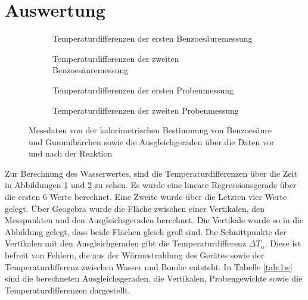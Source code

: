 \section{Auswertung}
\begin{figure}[t]
	\centering
	\begin{subfigure}{0.4\textwidth}
		\centering
		
		\caption{Temperaturdifferenzen der ersten Benzoesäuremessung}
		\label{abb:benz1}
	\end{subfigure}
	\hspace{5mm}
	\begin{subfigure}{0.4\textwidth}
		\centering
		
		\caption{Temperaturdifferenzen der zweiten Benzoesäuremessung}
		\label{abb:benz2}
	\end{subfigure}
	\hfill
	\begin{subfigure}{0.4\textwidth}
		\centering
		
		\caption{Temperaturdifferenzen der ersten Probenmessung}
		\label{abb:gummi1}
	\end{subfigure}
	\hspace{5mm}
	\begin{subfigure}{0.4\textwidth}
		\centering
		
		\caption{Temperaturdifferenzen der zweiten Probenmessung}
		\label{abb:gummi2}
	\end{subfigure}
	\caption{Messdaten von der kalorimetrischen Bestimmung von Benzoesäure und Gummibärchen sowie die Ausgleichgeraden über die Daten vor und nach der Reaktion}
\end{figure}
Zur Berechnung des Wasserwertes, sind die Temperaturdifferenzen über die Zeit in Abbildungen \ref{abb:benz1} und \ref{abb:benz2} zu sehen.
Es wurde eine lineare Regressionsgerade über die ersten 6 Werte berechnet. 
Eine Zweite wurde über die Letzten vier Werte gelegt.
Über Geogebra wurde die Fläche zwischen einer Vertikalen, den Messpunkten und den Ausgleichsgeraden berechnet.
Die Vertikale wurde so in die Abbildung gelegt, dass beide Flächen gleich groß sind.
Die Schnittpunkte der Vertikalen mit den Ausgleichgeraden gibt die Temperaturdifferenz $\Delta T_\alpha$.
Diese ist befreit von Fehlern, die aus der Wärmestrahlung des Gerätes sowie der Temperaturdifferenz zwischen Wasser und Bombe entsteht.
In Tabelle \ref{tab:1w} sind die berechneten Ausgleichsgeraden, die Vertikalen, Probengewichte sowie die Temperaturdifferenzen dargestellt.

